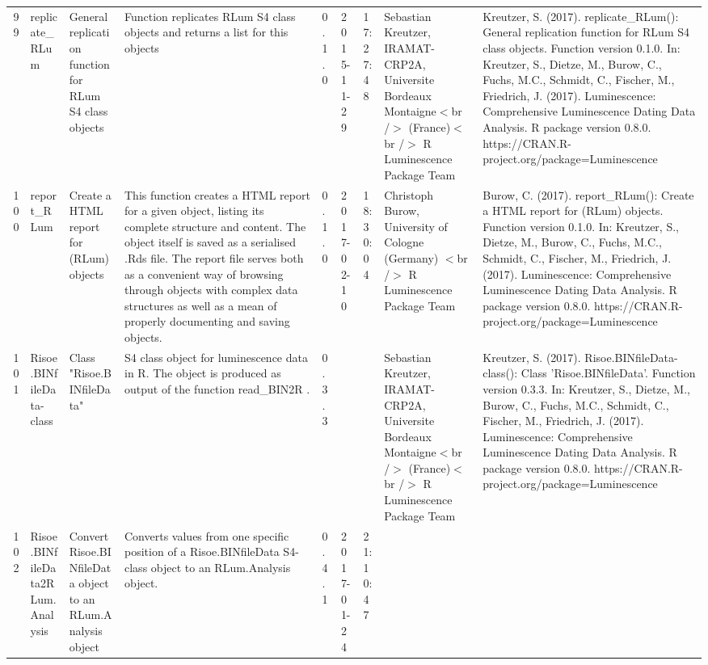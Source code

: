 \begin{table}[ht]
\begin{tabular}{rllllllll}
 \\ 
  99 & replicate\_RLum & General replication function for RLum S4 class objects & Function replicates RLum S4 class objects and returns a list for this objects & 0.1.0 & 2015-11-29 & 17:27:48
 & Sebastian Kreutzer, IRAMAT-CRP2A, Universite Bordeaux Montaigne$<$br /$>$ (France)$<$br /$>$  R Luminescence Package Team & Kreutzer, S. (2017). replicate\_RLum(): General replication function for RLum S4 class objects. Function version 0.1.0. In: Kreutzer, S., Dietze, M., Burow, C., Fuchs, M.C., Schmidt, C., Fischer, M., Friedrich, J. (2017). Luminescence: Comprehensive Luminescence Dating Data Analysis. R package version 0.8.0. https://CRAN.R-project.org/package=Luminescence
 \\ 
  100 & report\_RLum & Create a HTML report for (RLum) objects & This function creates a HTML report for a given object, listing its complete structure and content. The object itself is saved as a serialised .Rds file. The report file serves both as a convenient way of browsing through objects with  complex data structures as well as a mean of properly documenting and saving objects. & 0.1.0 & 2017-02-10 & 18:30:04
 & Christoph Burow, University of Cologne (Germany)  $<$br /$>$  R Luminescence Package Team & Burow, C. (2017). report\_RLum(): Create a HTML report for (RLum) objects. Function version 0.1.0. In: Kreutzer, S., Dietze, M., Burow, C., Fuchs, M.C., Schmidt, C., Fischer, M., Friedrich, J. (2017). Luminescence: Comprehensive Luminescence Dating Data Analysis. R package version 0.8.0. https://CRAN.R-project.org/package=Luminescence
 \\ 
  101 & Risoe.BINfileData-class & Class  "Risoe.BINfileData" & S4 class object for luminescence data in R. The object is produced as output of the function  read\_BIN2R . & 0.3.3
 &  &  & Sebastian Kreutzer, IRAMAT-CRP2A, Universite Bordeaux Montaigne$<$br /$>$ (France)$<$br /$>$  R Luminescence Package Team & Kreutzer, S. (2017). Risoe.BINfileData-class(): Class 'Risoe.BINfileData'. Function version 0.3.3. In: Kreutzer, S., Dietze, M., Burow, C., Fuchs, M.C., Schmidt, C., Fischer, M., Friedrich, J. (2017). Luminescence: Comprehensive Luminescence Dating Data Analysis. R package version 0.8.0. https://CRAN.R-project.org/package=Luminescence
 \\ 
  102 & Risoe.BINfileData2RLum.Analysis & Convert Risoe.BINfileData object to an RLum.Analysis object & Converts values from one specific position of a Risoe.BINfileData S4-class object to an RLum.Analysis object. & 0.4.1 & 2017-01-24 & 21:10:47

\end{tabular}
\end{table}
